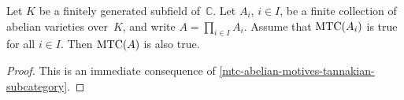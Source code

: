 \documentclass[10pt,twoside,leqno]{article}
\numberwithin{equation}{subsection}
\newcommand{\CC}{\mathbb{C}}
\newcommand{\MTC}{\textnormal{MTC}}
\begin{document}
\begin{theorem} %
 \label{mtcaxa}
 Let $K$ be a finitely generated subfield of~$\CC$.
 Let $A_i$, $i \in I$, be a finite collection of abelian varieties over~$K$,
	and write $A = \prod_{i \in I} A_i$.
 Assume that $\MTC(A_i)$ is true for all $i \in I$.
 Then $\MTC(A)$ is also true.
 \begin{proof}
  This is an immediate consequence of
  \cref{mtc-abelian-motives-tannakian-subcategory}.
 \end{proof}
\end{theorem}


\printbibliography
\end{document}
